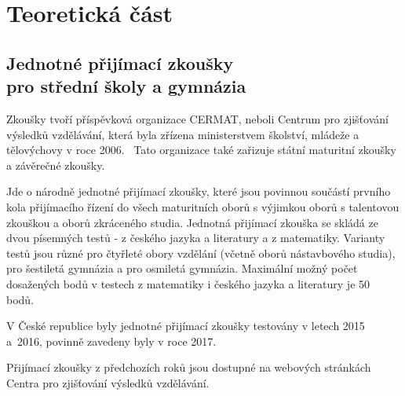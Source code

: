 \chapter{Teoretická část}


\section[Jednotné přijímací zkoušky pro střední školy a gymnázia]{Jednotné přijímací zkoušky\\pro střední školy a gymnázia}

Zkoušky tvoří příspěvková organizace CERMAT, neboli Centrum pro zjišťování výsledků vzdělávání, která byla zřízena ministerstvem školství, mládeže a tělovýchovy v roce 2006.~\cite{zakon_CERMAT} Tato organizace také zařizuje státní maturitní zkoušky a závěrečné zkoušky.~\cite{CERMAT_p_m}



Jde o národně jednotné přijímací zkoušky, které jsou povinnou součástí prvního kola přijímacího řízení do všech maturitních oborů s výjimkou oborů s talentovou zkouškou a oborů zkráceného studia.
Jednotná přijímací zkouška se skládá ze dvou písemných testů - z českého jazyka a literatury a z matematiky.
Varianty testů jsou různé pro čtyřleté obory vzdělání (včetně oborů nástavbového studia), pro šestiletá gymnázia a pro osmiletá gymnázia.
Maximální možný počet dosažených bodů v testech z matematiky i českého jazyka a literatury je 50 bodů.~\cite{CERMAT_co_to_je}

V České republice byly jednotné přijímací zkoušky testovány v letech 2015 a~2016, povinně zavedeny byly v roce 2017.~\cite{CERMAT_rocni_zprava}

Přijímací zkoušky z předchozích roků jsou dostupné na webových stránkách Centra pro zjišťování výsledků vzdělávání.~\cite{CERMAT_pdfka}


